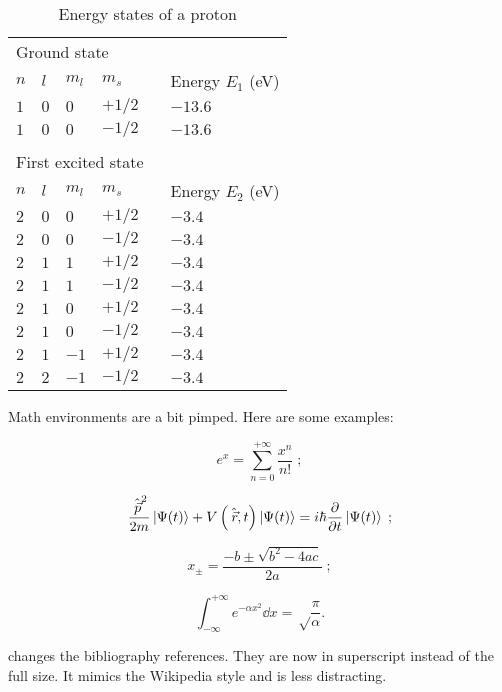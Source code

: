 \documentclass[a4paper, 11pt]{old-dms}
\begin{document}
\begin{table}[ht!]
    \centering
    \caption{Energy states of a proton}
    \label{tab:energy}
    \begin{tabularx}{.6\textwidth}{llllXl}
        \toprule
        \midrule
        \multicolumn{6}{l}{Ground state} \\
        $n$ & $l$ & $m_l$ & $m_s$ &  & Energy $E_1$ (eV)\\
        \midrule
        $1$ & $0$ & $0$ & $+1/2$ & & $- 13.6$ \\
        $1$ & $0$ & $0$ & $-1/2$ & & $- 13.6$ \\
         & & & & & \\
        \multicolumn{6}{l}{First excited state} \\
        $n$ & $l$ & $m_l$ & $m_s$ &  & Energy $E_2$ (eV)\\
        \midrule
        $2$ & $0$ & $0$ & $+1/2$ & & $-3.4$ \\
        $2$ & $0$ & $0$ & $-1/2$ & & $-3.4$ \\
        $2$ & $1$ & $1$ & $+1/2$ & & $-3.4$ \\
        $2$ & $1$ & $1$ & $-1/2$ & & $-3.4$ \\
        $2$ & $1$ & $0$ & $+1/2$ & & $-3.4$ \\
        $2$ & $1$ & $0$ & $-1/2$ & & $-3.4$ \\
        $2$ & $1$ & $-1$ & $+1/2$ & & $-3.4$ \\
        $2$ & $2$ & $-1$ & $-1/2$ & & $-3.4$ \\
        \midrule
        \bottomrule
    \end{tabularx}
\end{table}

Math environments are a bit pimped. Here are some examples:

$$
e^x = \sum_{n=0}^{+\infty} \frac{x^n}{n!} \;; 
$$

$$
\frac{{\hat{\vec p}}^2}{2m}\ket{\Psi(t)} + V\left(\hat{\vec r},t\right)\ket{\Psi(t)} = i\hbar \pdv{}{t}\ket{\Psi(t)} \;;
$$

$$
x_\pm = \frac{-b \pm \sqrt{b^2 - 4ac}}{2a}\;;
$$

$$
\int_{-\infty}^{+\infty} e^{-\alpha x^2} \dd{x} = \sqrt\frac{\pi}{\alpha}.
$$

 changes the bibliography references. They are now in superscript instead of the full size. It mimics the Wikipedia\cite{ref:wikipedia} style and is less distracting.
\end{document}
